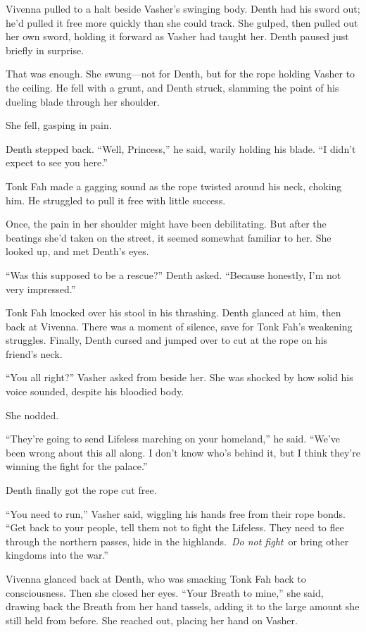 Vivenna pulled to a halt beside Vasher’s swinging body. Denth had his sword out; he’d pulled it free more quickly than she could track. She gulped, then pulled out her own sword, holding it forward as Vasher had taught her. Denth paused just briefly in surprise.

That was enough. She swung—not for Denth, but for the rope holding Vasher to the ceiling. He fell with a grunt, and Denth struck, slamming the point of his dueling blade through her shoulder.

She fell, gasping in pain.

Denth stepped back. “Well, Princess,” he said, warily holding his blade. “I didn’t expect to see you here.”

Tonk Fah made a gagging sound as the rope twisted around his neck, choking him. He struggled to pull it free with little success.

Once, the pain in her shoulder might have been debilitating. But after the beatings she’d taken on the street, it seemed somewhat familiar to her. She looked up, and met Denth’s eyes.

“Was this supposed to be a rescue?” Denth asked. “Because honestly, I’m not very impressed.”

Tonk Fah knocked over his stool in his thrashing. Denth glanced at him, then back at Vivenna. There was a moment of silence, save for Tonk Fah’s weakening struggles. Finally, Denth cursed and jumped over to cut at the rope on his friend’s neck.

“You all right?” Vasher asked from beside her. She was shocked by how solid his voice sounded, despite his bloodied body.

She nodded.

“They’re going to send Lifeless marching on your homeland,” he said. “We’ve been wrong about this all along. I don’t know who’s behind it, but I think they’re winning the fight for the palace.”

Denth finally got the rope cut free.

“You need to run,” Vasher said, wiggling his hands free from their rope bonds. “Get back to your people, tell them not to fight the Lifeless. They need to flee through the northern passes, hide in the highlands.~\textit{Do not fight}~or bring other kingdoms into the war.”

Vivenna glanced back at Denth, who was smacking Tonk Fah back to consciousness. Then she closed her eyes. “Your Breath to mine,” she said, drawing back the Breath from her hand tassels, adding it to the large amount she still held from before. She reached out, placing her hand on Vasher.


